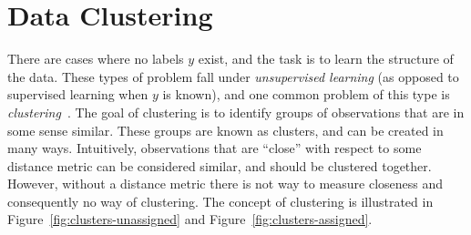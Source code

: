 

\section{Data Clustering}
There are cases where no labels $y$ exist, and the
task is to learn the structure of the data. These types of problem
fall under \textit{unsupervised learning} (as opposed to supervised
learning when $y$ is known), and one common problem of this type is
\textit{clustering}~\cite{Bishop-2006}. The goal of clustering is to
identify groups of observations that are in some sense similar. These
groups are known as clusters, and can be created in many ways. Intuitively,
observations that are ``close'' with respect to some distance metric
can be considered similar, and should be clustered together. However,
without a distance metric there is not way to measure closeness and consequently
no way of clustering. The concept of clustering is illustrated in
Figure~\ref{fig:clusters-unassigned} and Figure~\ref{fig:clusters-assigned}.
